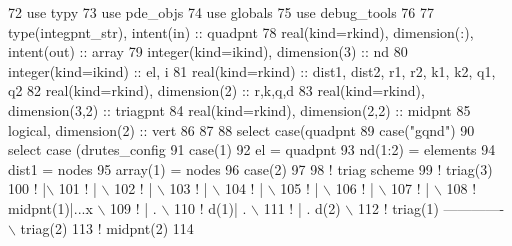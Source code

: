 \begin{DoxyCode}
72     \textcolor{keywordtype}{use }typy
73     \textcolor{keywordtype}{use }pde_objs
74     \textcolor{keywordtype}{use }globals
75     \textcolor{keywordtype}{use }debug_tools
76     
77     \textcolor{keywordtype}{type}(integpnt_str), \textcolor{keywordtype}{intent(in)} :: quadpnt
78     \textcolor{keywordtype}{real(kind=rkind)}, \textcolor{keywordtype}{dimension(:)}, \textcolor{keywordtype}{intent(out)} :: array
79     \textcolor{keywordtype}{integer(kind=ikind)}, \textcolor{keywordtype}{dimension(3)} :: nd
80     \textcolor{keywordtype}{integer(kind=ikind)} :: el, i
81     \textcolor{keywordtype}{real(kind=rkind)} :: dist1, dist2, r1, r2, k1, k2, q1, q2
82     \textcolor{keywordtype}{real(kind=rkind)}, \textcolor{keywordtype}{dimension(2)} :: r,k,q,d
83     \textcolor{keywordtype}{real(kind=rkind)}, \textcolor{keywordtype}{dimension(3,2)} :: triagpnt
84     \textcolor{keywordtype}{real(kind=rkind)}, \textcolor{keywordtype}{dimension(2,2)} :: midpnt
85     \textcolor{keywordtype}{logical}, \textcolor{keywordtype}{dimension(2)} :: vert 
86      
87     
88     \textcolor{keywordflow}{select case}(quadpnt%
89       \textcolor{keywordflow}{case}(\textcolor{stringliteral}{"gqnd"})
90         \textcolor{keywordflow}{select case} (drutes_config%
91           \textcolor{keywordflow}{case}(1)
92             el = quadpnt%
93             nd(1:2) = elements%
94             dist1 = nodes%
95             array(1) = nodes%
96            \textcolor{keywordflow}{case}(2)
97            
98 \textcolor{comment}{! triag scheme    }
99 \textcolor{comment}{!          triag(3)}
100 \textcolor{comment}{!          |\(\backslash\) }
101 \textcolor{comment}{!          | \(\backslash\) }
102 \textcolor{comment}{!          |  \(\backslash\)}
103 \textcolor{comment}{!          |   \(\backslash\)}
104 \textcolor{comment}{!          |    \(\backslash\)}
105 \textcolor{comment}{!          |     \(\backslash\)}
106 \textcolor{comment}{!          |      \(\backslash\)}
107 \textcolor{comment}{!          |       \(\backslash\)}
108 \textcolor{comment}{! midpnt(1)|...x    \(\backslash\)}
109 \textcolor{comment}{!          |   .     \(\backslash\)}
110 \textcolor{comment}{!      d(1)|   .      \(\backslash\)}
111 \textcolor{comment}{!          |   . d(2)  \(\backslash\)}
112 \textcolor{comment}{! triag(1) -------------\(\backslash\) triag(2)}
113 \textcolor{comment}{!              midpnt(2)}
114           

\end{DoxyCode}
